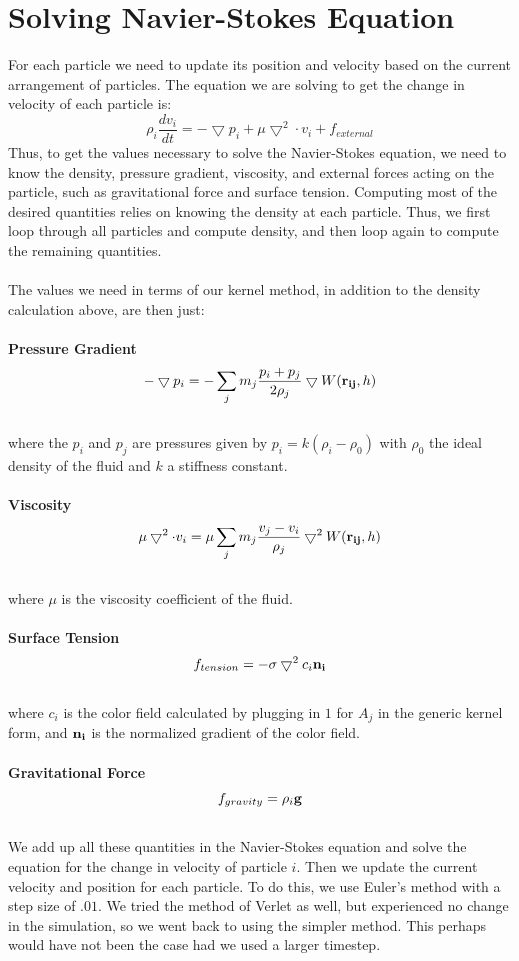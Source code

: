 \documentclass[11pt]{article}
\begin{document}
\section*{Solving Navier-Stokes Equation}
For each particle we need to update its position and velocity based on the current arrangement of particles. The equation we are solving to get the change in velocity of each particle is:
$$\rho_i \frac{dv_i}{dt} = - \bigtriangledown p_i + \mu \bigtriangledown^2 \cdot v_i + f_{external}$$
Thus, to get the values necessary to solve the Navier-Stokes equation, we need to know the density, pressure gradient, viscosity, and external forces acting on the particle, such as gravitational force and surface tension. Computing most of the desired quantities relies on knowing the density at each particle. Thus, we first loop through all particles and compute density, and then loop again to compute the remaining quantities.
\\
\\
The values we need in terms of our kernel method, in addition to the density calculation above, are then just:\\ \\
{\bf Pressure Gradient}
$$ - \bigtriangledown p_i = - \sum_{j}m_j \frac{p_i+p_j}{2\rho_j} \bigtriangledown W({\bf r_{ij}},h)$$
\\
where the $p_i$ and $p_j$ are pressures given by $p_i = k(\rho_i - \rho_0)$ with $\rho_0$ the ideal density of the fluid and $k$ a stiffness constant.
\\
\\
{\bf Viscosity}
$$ \mu \bigtriangledown^2 \cdot v_i = \mu  \sum_{j} m_j \frac{v_j-v_i}{\rho_j} \bigtriangledown^2 W({\bf r_{ij}},h) $$
\\
where $\mu$ is the viscosity coefficient of the fluid.
\\
\\
{\bf Surface Tension}
$$f_{tension} = -\sigma \bigtriangledown^2 c_i {\bf n_i}$$
\\
where $c_i$ is the color field calculated by plugging in $1$ for $A_j$ in the generic kernel form, and ${\bf n_i}$ is the normalized gradient of the color field.
\\
\\
{\bf Gravitational Force}
$$f_{gravity} = \rho_i {\bf g}$$
\\
We add up all these quantities in the Navier-Stokes equation and solve the equation for the change in velocity of particle $i$. Then we update the current velocity and position for each particle. To do this, we use Euler's method with a step size of $.01$.
We tried the method of Verlet as well, but experienced no change in the simulation, so we went back to using the simpler method. This perhaps would have not been the case had we used a larger timestep.
\end{document}
